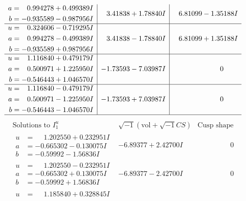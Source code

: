 \documentclass[1p]{elsarticle_modified}
\theoremstyle{definition}
\newcommand{\I}{\sqrt{-1}}
\begin{document}
$$\begin{array}{c|c|c}
\begin{aligned}
a &= \phantom{-}0.994278 + 0.499389 I \\
b &= -0.935589 - 0.987956 I\end{aligned}
 & \phantom{-}3.41838 + 1.78840 I & \phantom{-}6.81099 - 1.35188 I \\ \hline\begin{aligned}
u &= \phantom{-}0.324606 - 0.719295 I \\
a &= \phantom{-}0.994278 - 0.499389 I \\
b &= -0.935589 + 0.987956 I\end{aligned}
 & \phantom{-}3.41838 - 1.78840 I & \phantom{-}6.81099 + 1.35188 I \\ \hline\begin{aligned}
u &= \phantom{-}1.116840 + 0.479179 I \\
a &= \phantom{-}0.500971 + 1.225950 I \\
b &= -0.546443 + 1.046570 I\end{aligned}
 & -1.73593 - 7.03987 I & \phantom{-0.000000 } 0 \\ \hline\begin{aligned}
u &= \phantom{-}1.116840 - 0.479179 I \\
a &= \phantom{-}0.500971 - 1.225950 I \\
b &= -0.546443 - 1.046570 I\end{aligned}
 & -1.73593 + 7.03987 I & \phantom{-0.000000 } 0\\
 \hline 
 \end{array}$$\newpage$$\begin{array}{c|c|c}  
\text{Solutions to }I^u_{1}& \I (\text{vol} + \sqrt{-1}CS) & \text{Cusp shape}\\
 \hline 
\begin{aligned}
u &= \phantom{-}1.202550 + 0.232951 I \\
a &= -0.665302 - 0.130075 I \\
b &= -0.59992 - 1.56836 I\end{aligned}
 & -6.89377 + 2.42700 I & \phantom{-0.000000 } 0 \\ \hline\begin{aligned}
u &= \phantom{-}1.202550 - 0.232951 I \\
a &= -0.665302 + 0.130075 I \\
b &= -0.59992 + 1.56836 I\end{aligned}
 & -6.89377 - 2.42700 I & \phantom{-0.000000 } 0 \\ \hline\begin{aligned}
u &= \phantom{-}1.185840 + 0.328845 I \\

\end{aligned}
\end{array}$$
\end{document}
